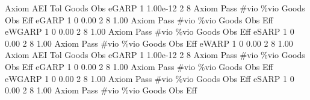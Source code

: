 {\smallskip}
       Axiom {\VBAR}       AEI        Tol      Goods        Obs 
       eGARP {\VBAR}         1   1.00e-12          2          8 
{\smallskip}
{\smallskip}
{\smallskip}
       Axiom {\VBAR} Pass        \#vio        \%vio       Goods         Obs         Eff  
       eGARP {\VBAR}    1           0        0.00           2           8        1.00  
{\smallskip}
{\smallskip}
{\smallskip}
       Axiom {\VBAR} Pass        \#vio        \%vio       Goods         Obs         Eff  
      eWGARP {\VBAR}    1           0        0.00           2           8        1.00  
{\smallskip}
{\smallskip}
{\smallskip}
       Axiom {\VBAR} Pass        \#vio        \%vio       Goods         Obs         Eff  
       eSARP {\VBAR}    1           0        0.00           2           8        1.00  
{\smallskip}
{\smallskip}
{\smallskip}
       Axiom {\VBAR} Pass        \#vio        \%vio       Goods         Obs         Eff  
       eWARP {\VBAR}    1           0        0.00           2           8        1.00  
{\smallskip}
       Axiom {\VBAR}       AEI        Tol      Goods        Obs 
       eGARP {\VBAR}         1   1.00e-12          2          8 
{\smallskip}
{\smallskip}
{\smallskip}
       Axiom {\VBAR} Pass        \#vio        \%vio       Goods         Obs         Eff  
       eGARP {\VBAR}    1           0        0.00           2           8        1.00  
{\smallskip}
{\smallskip}
{\smallskip}
       Axiom {\VBAR} Pass        \#vio        \%vio       Goods         Obs         Eff  
      eWGARP {\VBAR}    1           0        0.00           2           8        1.00  
{\smallskip}
{\smallskip}
{\smallskip}
       Axiom {\VBAR} Pass        \#vio        \%vio       Goods         Obs         Eff  
       eSARP {\VBAR}    1           0        0.00           2           8        1.00  
{\smallskip}
{\smallskip}
{\smallskip}
       Axiom {\VBAR} Pass        \#vio        \%vio       Goods         Obs         Eff  
